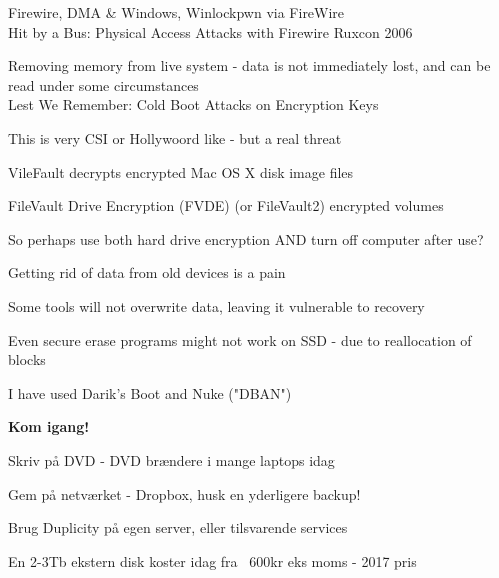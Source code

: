 \documentclass[20pt,landscape,a4paper,footrule]{foils}
\begin{document}
\begin{list1}
\item Firewire, DMA \& Windows, Winlockpwn via FireWire\\
Hit by a Bus: Physical Access Attacks with Firewire Ruxcon 2006
\vskip 5mm
\item Removing memory from live system - data is not immediately lost, and can be read under some circumstances\\
Lest We Remember: Cold Boot Attacks on Encryption Keys\\
\item This is very CSI or Hollywoord like - but a real threat
\item VileFault decrypts encrypted Mac OS X disk image files\\ 

\item  FileVault Drive Encryption (FVDE) (or FileVault2) encrypted volumes\\
\end{list1}

\centerline{So perhaps use both hard drive encryption AND turn off computer after use?}



\begin{list1}
\item Getting rid of data from old devices is a pain
\item Some tools will not overwrite data, leaving it vulnerable to recovery
\item Even secure erase programs might not work on SSD - due to reallocation of blocks
\item I have used Darik's Boot and Nuke ("DBAN") 
\end{list1}






\vskip 3cm
\centerline{\LARGE \bf Kom igang!}

\begin{list2}
\item Skriv på DVD - DVD brændere i mange laptops idag
\item Gem på netværket - Dropbox, husk en yderligere backup!
\item Brug Duplicity på egen server, eller tilsvarende services
\item En 2-3Tb ekstern disk koster idag fra ~600kr eks moms - 2017 pris
\end{list2}
\end{document}
